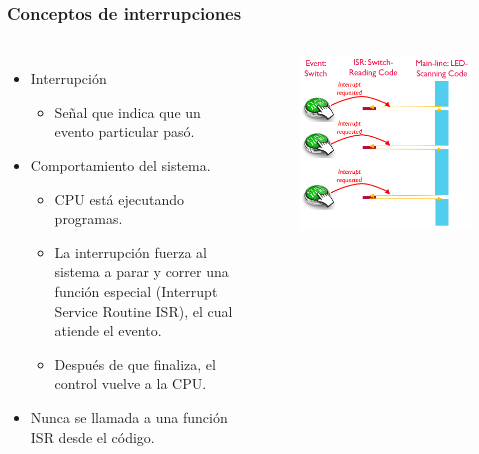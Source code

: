 \documentclass[10.5pt,scale=1.0,t,aspectratio=169,hyperref={pdfpagelabels=false}]{beamer}
\begin{document}
\begin{frame}
	\frametitle{Conceptos de interrupciones}
	\begin{columns}
		\begin{itemize}
			\item Interrupción
			\begin{itemize}
				\item Señal que indica que un evento particular pasó.
			\end{itemize}
			\item Comportamiento del sistema.
			\begin{itemize}
				\item CPU está ejecutando programas.
				\item La interrupción fuerza al sistema a parar y correr una función especial (Interrupt Service Routine ISR), el cual atiende el evento. 
				\item Después de que finaliza, el control vuelve a la CPU.
			\end{itemize}
			\item Nunca se llamada a una función ISR desde el código.
		\end{itemize}
		\begin{figure}
			\centering
			\includegraphics[scale=0.4]{08_ISRDiagram}
		\end{figure}
	\end{columns}
\end{frame}
\end{document}
